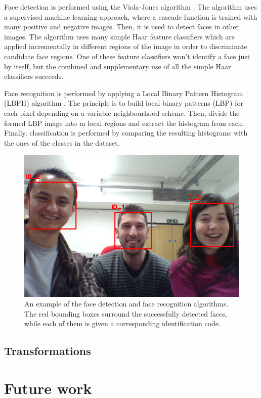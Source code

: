 \documentclass[conference]{IEEEtran}
\begin{document}
Face detection is performed using the Viola-Jones algorithm \cite{Viola01_RapidObjDet}. The algorithm uses a supervised machine learning approach, where a cascade function is trained with many positive and negative images. Then, it is used to detect faces in other images. The algorithm uses many simple Haar feature classifiers which are applied incrementally in different regions of the image in order to discriminate candidate face regions. One of these feature classifiers won't identify a face just by itself, but the combined and supplementary use of all the simple Haar classifiers succeeds.

Face recognition is performed by applying a Local Binary Pattern Histogram (LBPH) algorithm \cite{Ahonen04_FaceRecLBP}.  The principle is to build local binary patterns (LBP) for each pixel depending on a variable neighbourhood scheme. Then, divide the formed LBP image into m local regions and extract the histogram from each. Finally, classification is performed by comparing the resulting histograms with the ones of the classes in the dataset.

\begin{figure}[!t]
\centering
\includegraphics[width=3.in]{BARC_FaceRec.png}
\caption{An example of the face detection and face recognition algorithms. The red bounding boxes surround the successfully detected faces, while each of them is given a corresponding identification code.}
\label{fig:face}
\end{figure}

\subsection{Transformations}

\section{Future work}
\end{document}
